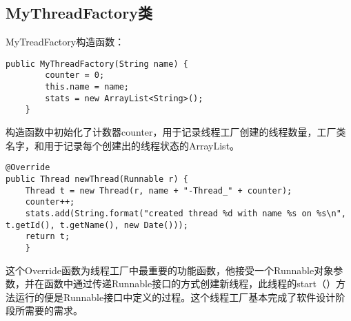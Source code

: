 \documentclass[bachelor]{thesis-uestc}
\begin{document}
\subsection{MyThreadFactory类}
MyTreadFactory构造函数：
\begin{lstlisting}[title=MyThreadFactory的构造函数]
public MyThreadFactory(String name) {
		counter = 0;
		this.name = name;	
		stats = new ArrayList<String>();
	}
\end{lstlisting}
\par 构造函数中初始化了计数器counter，用于记录线程工厂创建的线程数量，工厂类名字，和用于记录每个创建出的线程状态的ArrayList。
\begin{lstlisting}[title=MyThreadFactory的创建新线程函数]
@Override
public Thread newThread(Runnable r) {
	Thread t = new Thread(r, name + "-Thread_" + counter);
	counter++;
	stats.add(String.format("created thread %d with name %s on %s\n", t.getId(), t.getName(), new Date()));	
	return t;
	}
\end{lstlisting}
\par 这个Override函数为线程工厂中最重要的功能函数，他接受一个Runnable对象参数，并在函数中通过传递Runnable接口的方式创建新线程，此线程的start（）方法运行的便是Runnable接口中定义的过程。这个线程工厂基本完成了软件设计阶段所需要的需求。
\end{document}
